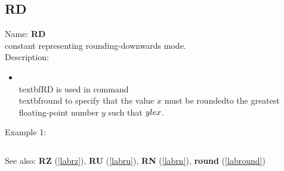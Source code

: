 \subsection{RD}
\label{labrd}
\noindent Name: \textbf{RD}\\
constant representing rounding-downwards mode.\\
\noindent Description: \begin{itemize}

\item \\textbf{RD} is used in command \\textbf{round} to specify that the value $x$ must be rounded\n   to the greatest floating-point number $y$ such that $y \\le x$.\n\end{itemize}
\noindent Example 1: 
\begin{center}\begin{minipage}{15cm}\begin{Verbatim}[frame=single]
\end{Verbatim}
\end{minipage}\end{center}
See also: \textbf{RZ} (\ref{labrz}), \textbf{RU} (\ref{labru}), \textbf{RN} (\ref{labrn}), \textbf{round} (\ref{labround})
